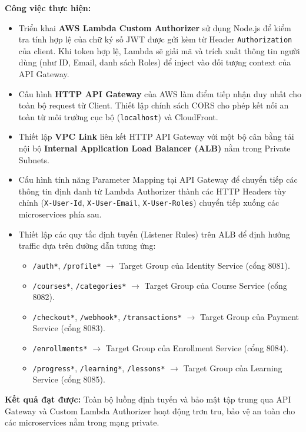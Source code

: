 \textbf{Công việc thực hiện:}
\begin{itemize}
    \item Triển khai \textbf{AWS Lambda Custom Authorizer} sử dụng Node.js để kiểm tra tính hợp lệ của chữ ký số JWT được gửi kèm từ Header \texttt{Authorization} của client. Khi token hợp lệ, Lambda sẽ giải mã và trích xuất thông tin người dùng (như ID, Email, danh sách Roles) để inject vào đối tượng context của API Gateway.
    \item Cấu hình \textbf{HTTP API Gateway} của AWS làm điểm tiếp nhận duy nhất cho toàn bộ request từ Client. Thiết lập chính sách CORS cho phép kết nối an toàn từ môi trường cục bộ (\texttt{localhost}) và CloudFront.
    \item Thiết lập \textbf{VPC Link} liên kết HTTP API Gateway với một bộ cân bằng tải nội bộ \textbf{Internal Application Load Balancer (ALB)} nằm trong Private Subnets.
    \item Cấu hình tính năng Parameter Mapping tại API Gateway để chuyển tiếp các thông tin định danh từ Lambda Authorizer thành các HTTP Headers tùy chỉnh (\texttt{X-User-Id}, \texttt{X-User-Email}, \texttt{X-User-Roles}) chuyển tiếp xuống các microservices phía sau.
    \item Thiết lập các quy tắc định tuyến (Listener Rules) trên ALB để định hướng traffic dựa trên đường dẫn tương ứng:
    \begin{itemize}
        \item \texttt{/auth*}, \texttt{/profile*} $\rightarrow$ Target Group của Identity Service (cổng 8081).
        \item \texttt{/courses*}, \texttt{/categories*} $\rightarrow$ Target Group của Course Service (cổng 8082).
        \item \texttt{/checkout*}, \texttt{/webhook*}, \texttt{/transactions*} $\rightarrow$ Target Group của Payment Service (cổng 8083).
        \item \texttt{/enrollments*} $\rightarrow$ Target Group của Enrollment Service (cổng 8084).
        \item \texttt{/progress*}, \texttt{/learning*}, \texttt{/lessons*} $\rightarrow$ Target Group của Learning Service (cổng 8085).
    \end{itemize}
\end{itemize}

\textbf{Kết quả đạt được:} Toàn bộ luồng định tuyến và bảo mật tập trung qua API Gateway và Custom Lambda Authorizer hoạt động trơn tru, bảo vệ an toàn cho các microservices nằm trong mạng private.

